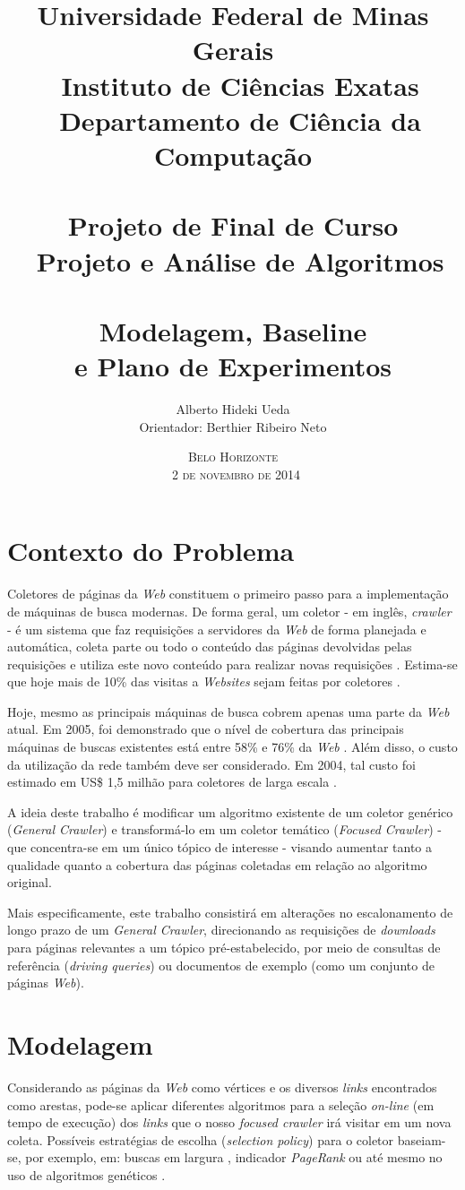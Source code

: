 \documentclass[a4paper,12pt,titlepage]{article}
\title{\large
Universidade Federal de Minas Gerais \\ \
Instituto de Ciências Exatas \\ \ 
Departamento de Ciência da Computação \\ \
\\[1cm]
Projeto de Final de Curso\\ \
Projeto e Análise de Algoritmos\\ \
\\[1cm]
\textbf{\Large Modelagem, Baseline \\ e Plano de Experimentos }
\\[1cm]
}
\author{\large Alberto Hideki Ueda \\[0.5cm] 
	Orientador: Berthier Ribeiro Neto 
\\[3cm] }
\date{\textsc{Belo Horizonte\\ \
2 de novembro de 2014}}
\begin{document}
\maketitle

\pagebreak

\section{Contexto do Problema}

Coletores de páginas da \textit{Web} constituem o primeiro passo para a implementação de máquinas de busca modernas. De forma geral, um coletor - em inglês, \textit{crawler} - é um sistema que faz requisições a servidores da \textit{Web} de forma planejada e automática, coleta parte ou todo o conteúdo das páginas devolvidas pelas requisições e utiliza este novo conteúdo para realizar novas requisições \cite{b}. Estima-se que hoje mais de 10\% das visitas a \textit{Websites} sejam feitas por coletores \cite{nielsen}.

Hoje, mesmo as principais máquinas de busca cobrem apenas uma parte da \textit{Web} atual. Em 2005, foi demonstrado que o nível de cobertura das principais máquinas de buscas existentes está entre 58\% e 76\% da \textit{Web} \cite{gulli}. Além disso, o custo da utilização da rede também deve ser considerado. Em 2004, tal custo foi estimado em US\$ 1,5 milhão para coletores de larga escala \cite{craswell}. 

A ideia deste trabalho é modificar um algoritmo existente de um coletor genérico (\textit{General Crawler}) e transformá-lo em um coletor temático (\textit{Focused Crawler}) - que concentra-se em um único tópico de interesse - visando aumentar tanto a qualidade quanto a cobertura das páginas coletadas em relação ao algoritmo original.

Mais especificamente, este trabalho consistirá em alterações no escalonamento de longo prazo de um \textit{General Crawler}, direcionando as requisições de \textit{downloads} para páginas relevantes a um tópico pré-estabelecido, por meio de consultas de referência (\textit{driving queries}) ou documentos de exemplo (como um conjunto de páginas \textit{Web}).


\section{Modelagem}
Considerando as páginas da \textit{Web} como vértices e os diversos \textit{links} encontrados como arestas, pode-se aplicar diferentes algoritmos para a seleção \textit{on-line} (em tempo de execução) dos \textit{links} que o nosso \textit{focused crawler} irá visitar em um nova coleta. Possíveis estratégias de escolha (\textit{selection policy}) para o coletor baseiam-se, por exemplo, em: buscas em largura \cite{najork}, indicador \textit{PageRank} \cite{cho} ou até mesmo no uso de algoritmos genéticos \cite{johnson}. 
\end{document}
